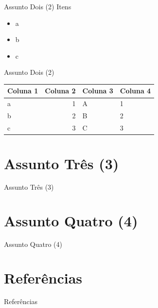\documentclass{beamer}
\begin{document}
    \begin{frame}{Assunto Dois (2)}
      Itens
      \begin{itemize}
        \item a
        \item b
        \item c
      \end{itemize}
    \end{frame}

    \begin{frame}{Assunto Dois (2)}
      \begin{table}[h]
        \centering
        \scriptsize
        \begin{tabular}{|l|r|l|l|}
          \hline
          \textbf{Coluna 1}  & \textbf{Coluna 2} & \textbf{Coluna 3} & \textbf{Coluna 4}  \\ \hline
          a                  & 1                 & A                 & 1                  \\ \hline
          b                  & 2                 & B                 & 2                  \\ \hline
          c                  & 3                 & C                 & 3                  \\ \hline
        \end{tabular}
        \label{tab:buscas}
      \end{table}
    \end{frame}

  \section{Assunto Três (3)}\label{sec:tres}

    \begin{frame}{Assunto Três (3)}
    \end{frame}

  \section{Assunto Quatro (4)}\label{sec:quatro}

    \begin{frame}{Assunto Quatro (4)}
    \end{frame}

  \section{Referências}\label{sec:referencias}

    \begin{frame}{Referências}
      \begingroup
        \scriptsize
        
        
      \endgroup
    \end{frame}

  \begin{frame}
    \titlepage
  \end{frame}
\end{document}
